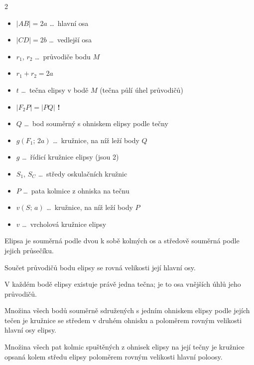 \documentclass[11pt,a4paper]{article}
\begin{document}
\begin{multicols}{2}
\begin{itemize}[nosep, label={}]
\item $|AB|=2a$ \dots\ hlavní osa
\item $|CD|=2b$ \dots\ vedlejší osa
\item $r_1$, $r_2$ \dots\ průvodiče bodu $M$
\item $r_1+r_2=2a$
\item $t$ \dots\ tečna elipsy v bodě $M$ (tečna půlí úhel průvodičů)
\item[\textbf{!}] $|F_2P|=|PQ|$ \textbf{!}
\item $Q$ \dots\ bod souměrný s ohniskem elipsy podle tečny
\item $g(F_1;\,2a)$ \dots\ kružnice, na níž leží body $Q$
\item $g$ \dots\ řídicí kružnice elipsy (jsou 2)
\item $S_1$, $S_C$ \dots\ středy oskulačních kružnic
\item $P$ \dots\ pata kolmice z ohniska na tečnu
\item $v(S;\,a)$ \dots\ kružnice, na níž leží body $P$
\item $v$ \dots\ vrcholová kružnice elipsy
\end{itemize}
\end{multicols}

\begin{description}[nosep, leftmargin=2em, labelwidth=1.5em]
\item[V:] Elipsa je souměrná podle dvou k sobě kolmých os a středově souměrná podle jejich průsečíku.
\item[V:] Součet průvodičů bodu elipsy se rovná velikosti její hlavní osy.
\item[V:] V každém bodě elipsy existuje právě jedna tečna; je to osa vnějších úhlů jeho průvodičů.
\item[V:] Množina všech bodů souměrně sdružených s jedním ohniskem elipsy podle jejích tečen je kružnice se středem v druhém ohnisku a poloměrem rovným velikosti hlavní osy elipsy.
\item[V:] Množina všech pat kolmic spuštěných z ohnisek elipsy na její tečny je kružnice opsaná kolem středu elipsy poloměrem rovným velikosti hlavní poloosy.
\end{description}
\end{document}
